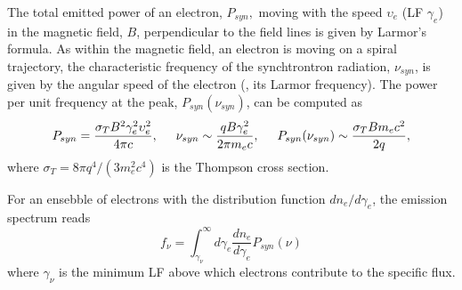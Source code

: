 %
%
The total emitted power of an electron, $P_{syn},$ moving with the speed $\upsilon_e$ 
(\ac{LF} $\gamma_e$) in the magnetic field, $B$, perpendicular to the field lines 
is given by Larmor's formula.
%
As within the magnetic field, an electron is moving on a spiral trajectory,
the characteristic frequency of the synchtrontron radiation, $\nu_{syn}$, is given 
by the angular speed of the electron (\eg, its Larmor frequency).
%
The power per unit frequency at the peak, $P_{syn}(\nu_{syn})$, can be computed as 
\citep{RybickiLightman:1985}
%
\begin{equation}
P_{syn} = \frac{\sigma_TB^2\gamma_e^2\upsilon_e^2}{4\pi c}, 
\hspace{5mm} 
\nu_{syn} \sim \frac{q B \gamma_e^2}{2\pi m_e c},
\hspace{5mm}
P_{syn}(\nu_{syn}) \sim \frac{\sigma_T B m_e c^2}{2 q},
\end{equation}
%
where $\sigma_T = 8\pi q^4 / (3m_e^2c^4)$ is the Thompson cross section.



%
%
For an ensebble of electrons with the distribution function $dn_e/d\gamma_e$, 
the emission spectrum reads 
%
\begin{equation}
f_{\nu} = \int_{\gamma_{\nu}}^{\infty} d\gamma_e \frac{dn_e}{d\gamma_e}P_{syn}(\nu) 
\label{eq:afterglow:sync_power}
\end{equation}
%
where $\gamma_{\nu}$ is the minimum \ac{LF} above which electrons contribute to the 
specific flux.


